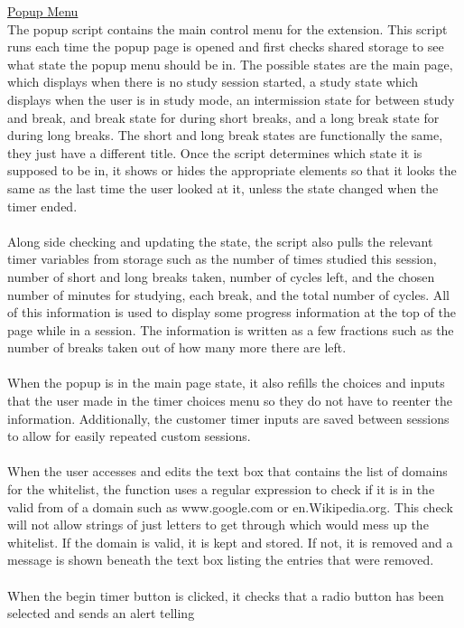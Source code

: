 \documentclass[12pt]{article}
\begin{document}
\noindent \underline{Popup Menu} \\
The popup script contains the main control menu for the extension. This script runs each time the popup page 
is opened and first checks shared storage to see what state the popup menu should be in. The possible states 
are the main page, which displays when there is no study session started, a study state which displays when 
the user is in study mode, an intermission state for between study and break, and break state for during short breaks, 
and a long break state for during long breaks. The short and long break states are functionally the same, they just 
have a different title. Once the script determines which state it is supposed to be in, it shows or hides the 
appropriate elements so that it looks the same as the last time the user looked at it, unless the state changed when the timer ended. 
\\\\Along side checking and updating the state, the script also pulls the relevant timer variables from storage such as 
the number of times studied this session, number of short and long breaks taken, number of cycles left, and the chosen number of minutes 
for studying, each break, and the total number of cycles. All of this information is used to display some progress information at the top of 
the page while in a session. The information is written as a few fractions such as the number of breaks taken out of how many more there are left. 
\\\\When the popup is in the main page state, it also refills the choices and inputs that the user made 
in the timer choices menu so they do not have to reenter the information. Additionally, the customer timer inputs are saved between sessions to 
allow for easily repeated custom sessions. 
\\\\When the user accesses and edits the text box that contains the list of domains for the whitelist, 
the function uses a regular expression to check if it is in the valid from of a domain such as www.google.com or en.Wikipedia.org. 
This check will not allow strings of just letters to get through which would mess up the whitelist. If the domain is valid, it is kept and stored. 
If not, it is removed and a message is shown beneath the text box listing the entries that were removed. 
\\\\When the begin timer button is clicked, it checks that a radio button has been selected and sends an alert telling 
\end{document}
